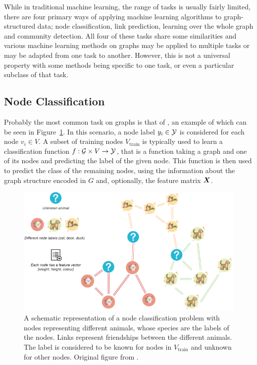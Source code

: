 While in traditional machine learning, the range of tasks is usually fairly limited, there are four primary ways of applying machine learning algorithms to graph-structured data; node classification, link prediction, learning over the whole graph and community detection. All four of these tasks share some similarities and various machine learning methods on graphs may be applied to multiple tasks or may be adapted from one task to another. However, this is not a universal property with some methods being specific to one task, or even a particular subclass of that task.

\subsection{Node Classification}

Probably the most common task on graphs is that of , an example of which can be seen in Figure~\ref{fig:node-classification}. In this scenario, a node label \( y_i \in \mathcal{Y} \) is considered for each node \( v_i \in V \). A subset of training nodes \( V_\mathrm{train} \) is typically used to learn a classification function \( f : \mathcal{G} \times V \to \mathcal{Y} \), that is a function taking a graph and one of its nodes and predicting the label of the given node. This function is then used to predict the class of the remaining nodes, using the information about the graph structure encoded in \( G \) and, optionally, the feature matrix \( \bm{X} \). 

\begin{figure}
	\includegraphics[width=\linewidth]{images/graph-tasks/node-classification.png}
	\caption{A schematic representation of a node classification problem with nodes representing different animals, whose species are the labels of the nodes. Links represent friendships between the different animals. The label is considered to be known for nodes in \( V_\mathrm{train} \) and unknown for other nodes. Original figure from \cite{kubara_machine_2020}.}
	\label{fig:node-classification}
\end{figure}

